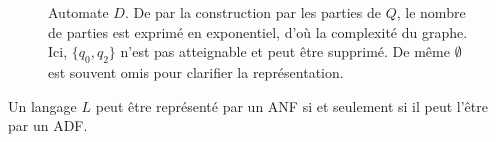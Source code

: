 \begin{example}
\begin{figure}[H]
	\caption{Automate $D$. De par la construction par les parties de $Q$, le nombre de parties est exprimé en exponentiel, d'où la complexité du graphe. Ici, $\{q_0,q_2\}$ n'est pas atteignable et peut être supprimé. De même $\emptyset$ est souvent omis pour clarifier la représentation.}\label{fig:dndf}
\end{figure}
\end{example}



\begin{theorem}\label{anf-dnf}
	Un langage $L$ peut être représenté par un ANF si et seulement si il peut l'être par un ADF.
\end{theorem}

